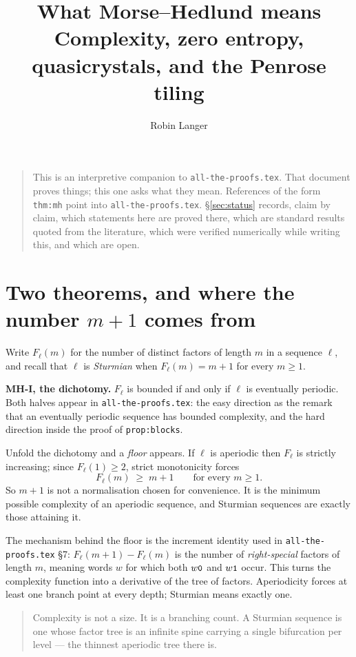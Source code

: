 \documentclass[11pt,a4paper]{article}
\title{What Morse--Hedlund means\\
\large Complexity, zero entropy, quasicrystals, and the Penrose tiling}
\author{Robin Langer}
\date{}
\newcommand{\seq}[1]{\texttt{\small #1}}
\theoremstyle{definition}
\theoremstyle{plain}
\begin{document}
\maketitle
\vspace{-2em}

\begin{quote}\small
This is an interpretive companion to \texttt{all-the-proofs.tex}. That document
proves things; this one asks what they mean. References of the form
\texttt{thm:mh} point into \texttt{all-the-proofs.tex}. \S\ref{sec:status}
records, claim by claim, which statements here are proved there, which are
standard results quoted from the literature, which were verified numerically
while writing this, and which are open.
\end{quote}

\section{Two theorems, and where the number $m+1$ comes from}

Write $F_\ell(m)$ for the number of distinct factors of length $m$ in a
sequence $\ell$, and recall that $\ell$ is \emph{Sturmian} when
$F_\ell(m) = m+1$ for every $m \geq 1$.

\textbf{MH-I, the dichotomy.} $F_\ell$ is bounded if and only if $\ell$ is
eventually periodic. Both halves appear in \texttt{all-the-proofs.tex}: the easy
direction as the remark that an eventually periodic sequence has bounded
complexity, and the hard direction inside the proof of
\texttt{prop:blocks}.

Unfold the dichotomy and a \emph{floor} appears. If $\ell$ is aperiodic then
$F_\ell$ is strictly increasing; since $F_\ell(1) \geq 2$, strict monotonicity
forces
\[
  F_\ell(m) \;\geq\; m+1 \qquad \text{for every } m \geq 1 .
\]
So $m+1$ is not a normalisation chosen for convenience. It is the minimum
possible complexity of an aperiodic sequence, and Sturmian sequences are exactly
those attaining it.

The mechanism behind the floor is the increment identity used in
\texttt{all-the-proofs.tex} \S7: $F_\ell(m+1) - F_\ell(m)$ is the number of
\emph{right-special} factors of length $m$, meaning words $w$ for which both
$w\seq{0}$ and $w\seq{1}$ occur. This turns the complexity function into a
derivative of the tree of factors. Aperiodicity forces at least one branch point
at every depth; Sturmian means exactly one.

\begin{quote}
Complexity is not a size. It is a branching count. A Sturmian sequence is one
whose factor tree is an infinite spine carrying a single bifurcation per level
--- the thinnest aperiodic tree there is.
\end{quote}
\end{document}
